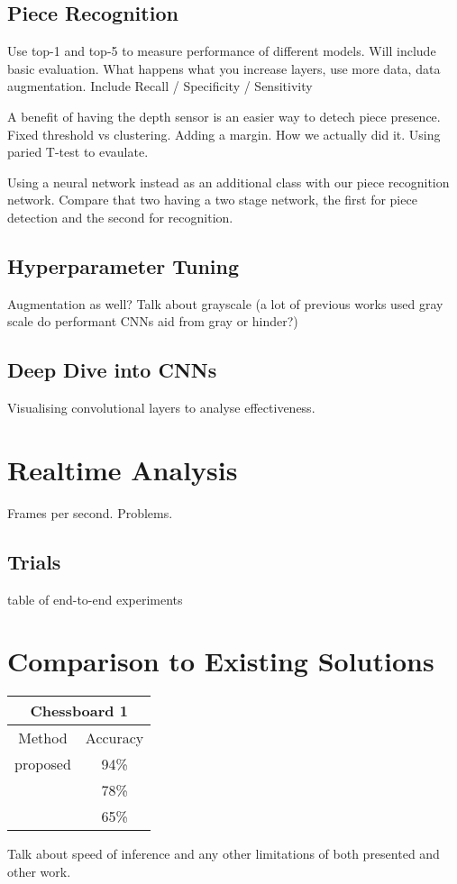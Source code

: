 \subsection{Piece Recognition}
Use top-1 and top-5 to measure performance of different models.
Will include basic evaluation.  What happens what you increase layers, use more data, data augmentation.
Include Recall / Specificity / Sensitivity

A benefit of having the depth sensor is an easier way to detech piece presence.  
Fixed threshold vs clustering.  Adding a margin.  How we actually did it.
Using paried T-test to evaulate.

Using a neural network instead as an additional class with our piece recognition network.
Compare that two having a two stage network, the first for piece detection and the second for recognition.

\subsection{Hyperparameter Tuning}
Augmentation as well?
Talk about grayscale (a lot of previous works used gray scale do performant CNNs aid from gray or hinder?)

\subsection{Deep Dive into CNNs}
Visualising convolutional layers to analyse effectiveness.

\section{Realtime Analysis}
Frames per second.  Problems.

\subsection{Trials}
table of end-to-end experiments

\section{Comparison to Existing Solutions}
\begin{center}
\begin{tabular}{|c|c|}
    \multicolumn{2}{c}{Chessboard 1} \\
    \hline
    Method & Accuracy \\
    \hline
    proposed & 94\% \\
    \cite{} & 78\% \\
    \cite{} & 65\%  \\
    \hline
\end{tabular}
\end{center}

Talk about speed of inference and any other limitations of both presented and other work.